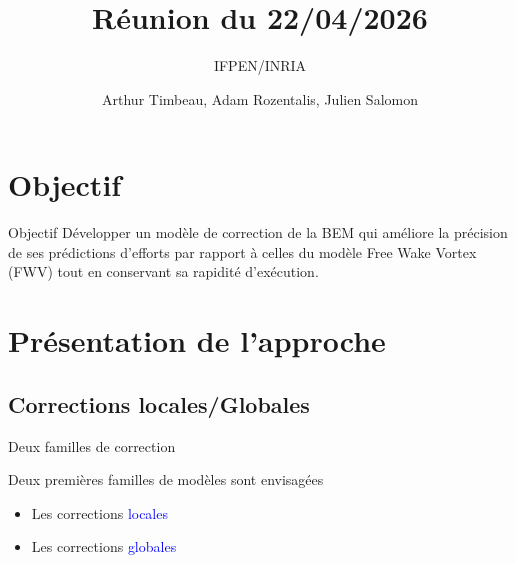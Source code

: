 \documentclass[
11pt,notheorems,hyperref={pdfauthor=whatever}
]{beamer}
\title[
]{Réunion du 22/04/2026}
\subtitle{IFPEN/INRIA}
\author[
]{
    Arthur Timbeau, 
    Adam Rozentalis,
    Julien Salomon
}
\begin{document}

\begin{frame}
  \titlepage
\end{frame}


\begin{frame}
    \tableofcontents
\end{frame}

\section{Objectif}

\begin{frame}{Objectif}
Développer un modèle de correction de la BEM qui améliore la précision de ses prédictions d'efforts par rapport à celles du modèle Free Wake Vortex (FWV) tout en conservant 
sa rapidité d'exécution.
\end{frame}


\section{Présentation de l'approche}

\subsection{Corrections locales/Globales}

\begin{frame}{Deux familles de correction}
    \begin{center}
    Deux premières familles de modèles sont envisagées
    \begin{itemize}
    \item Les corrections \textcolor{blue}{locales}
    \item Les corrections \textcolor{blue}{globales}
    \end{itemize}
\end{center}
\end{frame}
\end{document}
